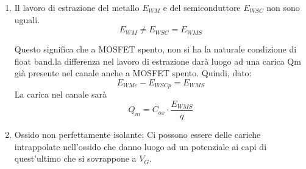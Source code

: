 \begin{enumerate}
    \item  Il lavoro di estrazione del metallo $E_{WM}$ e del semiconduttore $E_{WSC}$ non sono uguali.
\begin{equation}
            E_{WM} \neq E_{WSC} = E_{WMS}
        \end{equation}
        \begin{center}
\end{center}
\begin{center}
\end{center}
Questo significa che a MOSFET spento, non si ha la naturale condizione di float band.la differenza nel lavoro di estrazione darà luogo ad una carica Qm già presente nel canale anche a MOSFET spento. Quindi, dato:\begin{equation}
    E_{WMe}-E_{WSCp}=E_{WMS}
\end{equation}
La carica nel canale sarà
\begin{equation}
    Q_{m}=C_{ox}\cdot \dfrac{E_{WMS}}{q}
\end{equation}
        

    \item Ossido non perfettamente isolante:
    Ci possono essere delle cariche intrappolate nell'ossido che danno luogo ad un potenziale ai capi di quest'ultimo che si sovrappone a $V_G$.
\end{enumerate}

